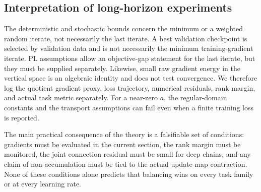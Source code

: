 \subsection{Interpretation of long-horizon experiments}
The deterministic and stochastic bounds concern the minimum or a weighted
random iterate, not necessarily the last iterate. A best validation
checkpoint is selected by validation data and is not necessarily the
minimum training-gradient iterate. PL assumptions allow an objective-gap
statement for the last iterate, but they must be supplied separately.
Likewise, small raw gradient energy in the vertical space is an algebraic
identity and does not test convergence. We therefore log the quotient
gradient proxy, loss trajectory, numerical residuals, rank margin,
and actual task metric separately. For a near-zero $a$, the regular-domain
constants and the transport assumptions can fail even when a finite
training loss is reported.

The main practical consequence of the theory is a falsifiable set of
conditions: gradients must be evaluated in the current section, the
rank margin must be monitored, the joint connection residual must be small
for deep chains, and any claim of non-accumulation must be tied to the
actual update-map contraction. None of these conditions alone predicts
that balancing wins on every task family or at every learning rate.
